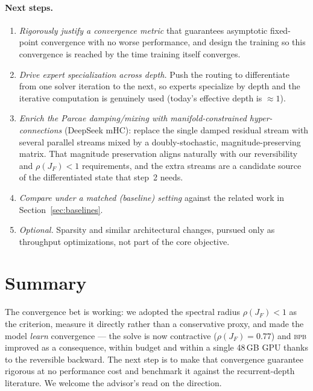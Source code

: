 \documentclass[11pt]{article}
\newcommand{\rhoF}{\rho(J_F)}
\newcommand{\bpb}{\textsc{bpb}}
\begin{document}
\paragraph{Next steps.}
\begin{enumerate}[leftmargin=1.4em, itemsep=2pt]
\item \emph{Rigorously justify a convergence metric} that guarantees asymptotic fixed-point convergence with no worse performance, and design the training so this convergence is reached by the time training itself converges.
\item \emph{Drive expert specialization across depth.} Push the routing to differentiate from one solver iteration to the next, so experts specialize by depth and the iterative computation is genuinely used (today's effective depth is $\approx 1$).
\item \emph{Enrich the Parcae damping/mixing with manifold-constrained hyper-connections} (DeepSeek mHC): replace the single damped residual stream with several parallel streams mixed by a doubly-stochastic, magnitude-preserving matrix. That magnitude preservation aligns naturally with our reversibility and $\rhoF<1$ requirements, and the extra streams are a candidate source of the differentiated state that step~2 needs.
\item \emph{Compare under a matched (baseline) setting} against the related work in Section~\ref{sec:baselines}.
\item \emph{Optional.} Sparsity and similar architectural changes, pursued only as throughput optimizations, not part of the core objective.
\end{enumerate}

\section{Summary}

The convergence bet is working: we adopted the spectral radius $\rhoF<1$ as the
criterion, measure it directly rather than a conservative proxy, and made the model
\emph{learn} convergence --- the solve is now contractive ($\rhoF=0.77$) and \bpb{}
improved as a consequence, within budget and within a single 48\,GB GPU thanks to the
reversible backward. The next step is to make that convergence guarantee rigorous at
no performance cost and benchmark it against the recurrent-depth literature. We
welcome the advisor's read on the direction.
\end{document}
